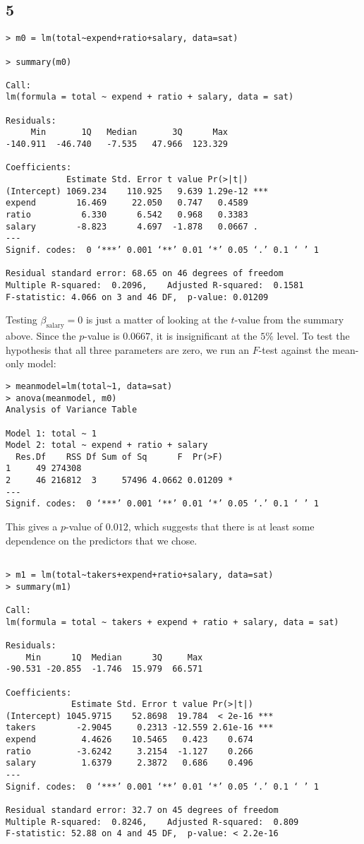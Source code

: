 \documentclass{article}
\begin{document}
\subsection*{5}
\begin{verbatim}
> m0 = lm(total~expend+ratio+salary, data=sat)

> summary(m0)

Call:
lm(formula = total ~ expend + ratio + salary, data = sat)

Residuals:
     Min       1Q   Median       3Q      Max 
-140.911  -46.740   -7.535   47.966  123.329 

Coefficients:
            Estimate Std. Error t value Pr(>|t|)    
(Intercept) 1069.234    110.925   9.639 1.29e-12 ***
expend        16.469     22.050   0.747   0.4589    
ratio          6.330      6.542   0.968   0.3383    
salary        -8.823      4.697  -1.878   0.0667 .  
---
Signif. codes:  0 ‘***’ 0.001 ‘**’ 0.01 ‘*’ 0.05 ‘.’ 0.1 ‘ ’ 1

Residual standard error: 68.65 on 46 degrees of freedom
Multiple R-squared:  0.2096,	Adjusted R-squared:  0.1581 
F-statistic: 4.066 on 3 and 46 DF,  p-value: 0.01209
\end{verbatim}

Testing $\beta_\text{salary}=0$ is just a matter of looking at the $t$-value from the summary above. Since the $p$-value is $0.0667$, it is insignificant at the $5\%$ level. To test the hypothesis that all three parameters are zero, we run an $F$-test against the mean-only model:
\begin{verbatim}
> meanmodel=lm(total~1, data=sat)
> anova(meanmodel, m0)
Analysis of Variance Table

Model 1: total ~ 1
Model 2: total ~ expend + ratio + salary
  Res.Df    RSS Df Sum of Sq      F  Pr(>F)  
1     49 274308                              
2     46 216812  3     57496 4.0662 0.01209 *
---
Signif. codes:  0 ‘***’ 0.001 ‘**’ 0.01 ‘*’ 0.05 ‘.’ 0.1 ‘ ’ 1
\end{verbatim}
This gives a $p$-value of $0.012$, which suggests that there is at least some dependence on the predictors that we chose. 
\begin{verbatim}

> m1 = lm(total~takers+expend+ratio+salary, data=sat)
> summary(m1)

Call:
lm(formula = total ~ takers + expend + ratio + salary, data = sat)

Residuals:
    Min      1Q  Median      3Q     Max 
-90.531 -20.855  -1.746  15.979  66.571 

Coefficients:
             Estimate Std. Error t value Pr(>|t|)    
(Intercept) 1045.9715    52.8698  19.784  < 2e-16 ***
takers        -2.9045     0.2313 -12.559 2.61e-16 ***
expend         4.4626    10.5465   0.423    0.674    
ratio         -3.6242     3.2154  -1.127    0.266    
salary         1.6379     2.3872   0.686    0.496    
---
Signif. codes:  0 ‘***’ 0.001 ‘**’ 0.01 ‘*’ 0.05 ‘.’ 0.1 ‘ ’ 1

Residual standard error: 32.7 on 45 degrees of freedom
Multiple R-squared:  0.8246,	Adjusted R-squared:  0.809 
F-statistic: 52.88 on 4 and 45 DF,  p-value: < 2.2e-16
\end{verbatim}
\end{document}
